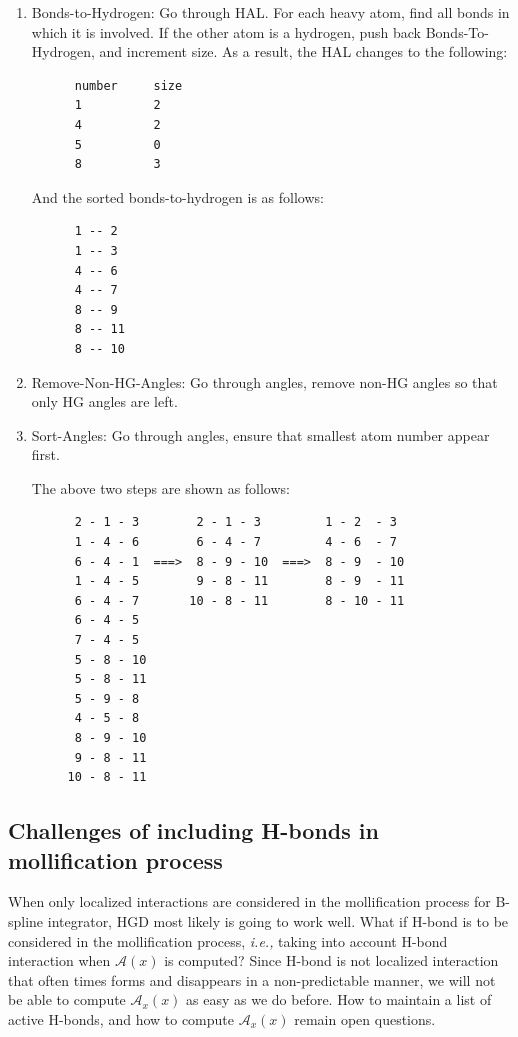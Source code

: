 \documentclass[11pt]{article}
\begin{document}
\begin{enumerate}
\item Bonds-to-Hydrogen: Go through HAL. For each heavy atom, find all 
bonds in which it is involved. If the other atom is a hydrogen,
push back Bonds-To-Hydrogen, and increment size. As a result, the HAL
changes to the following:
\begin{verbatim}
      number     size
      1          2
      4          2
      5          0
      8          3
\end{verbatim}
And the sorted bonds-to-hydrogen is as follows:
\begin{verbatim}
      1 -- 2
      1 -- 3
      4 -- 6
      4 -- 7
      8 -- 9
      8 -- 11
      8 -- 10
\end{verbatim}

\item Remove-Non-HG-Angles: Go through angles, remove non-HG angles so
that only HG angles are left.

\item Sort-Angles: Go through angles, ensure that smallest atom number 
appear first.

The above two steps are shown as follows:
\begin{verbatim}
      2 - 1 - 3        2 - 1 - 3         1 - 2  - 3
      1 - 4 - 6        6 - 4 - 7         4 - 6  - 7   
      6 - 4 - 1  ===>  8 - 9 - 10  ===>  8 - 9  - 10
      1 - 4 - 5        9 - 8 - 11        8 - 9  - 11
      6 - 4 - 7       10 - 8 - 11        8 - 10 - 11
      6 - 4 - 5 
      7 - 4 - 5 
      5 - 8 - 10
      5 - 8 - 11
      5 - 9 - 8 
      4 - 5 - 8 
      8 - 9 - 10
      9 - 8 - 11
     10 - 8 - 11
\end{verbatim}
\end{enumerate}

\subsection{Challenges of including H-bonds in mollification process}
When only localized interactions are considered in the mollification
process for B-spline integrator, HGD most likely is going to work
well. What if H-bond is to be considered in the mollification process, 
{\it i.e.,} taking into account H-bond interaction when
$\mathcal{A}(x)$ is computed? Since H-bond is not localized
interaction that often times forms and disappears in a non-predictable
manner, we will not be able to compute $\mathcal{A}_{x}(x)$ as easy as 
we do before. How to maintain a list of active H-bonds, and how to
compute $\mathcal{A}_{x}(x)$ remain open questions. 



\end{document}
